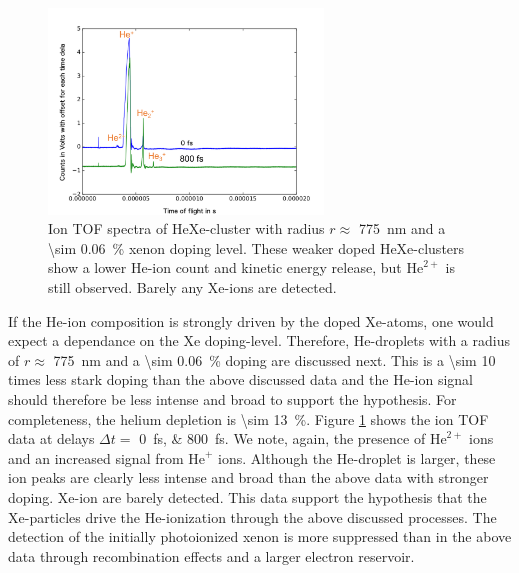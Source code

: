 %
\begin{figure}
 	\centering
 		\includegraphics[width=0.65\textwidth]{images/results/TOF-helium-xenon-cluster-13.png}
 	\caption[TOF spectra of HeXe-clusters with \SI{\sim 0.06}{\percent} Xe-doping at various delays.]{Ion TOF spectra of HeXe-cluster with radius $r\approx$ \SI{775}{\nano\meter} and a \SI{\sim 0.06}{\percent} xenon doping level. These weaker doped HeXe-clusters show a lower He-ion count and kinetic energy release, but $\text{He}^{2+}$ is still observed. Barely any Xe-ions are detected.}
 	\label{fig:TOF-helium-xenon-cluster-13}
\end{figure}
%
If the He-ion composition is strongly driven by the doped Xe-atoms, one would expect a dependance on the Xe doping-level. Therefore, He-droplets with a radius of $r\approx$ \SI{775}{\nano\meter} and a \SI{\sim 0.06}{\percent} doping are discussed next. This is a \num{\sim 10} times less stark doping than the above discussed data and the He-ion signal should therefore be less intense and broad to support the hypothesis. For completeness, the helium depletion is \SI{\sim 13}{\percent}. Figure \ref{fig:TOF-helium-xenon-cluster-13} shows the ion TOF data at delays $\Delta t=$ \SIlist{0;800}{\femto\second}. We note, again, the presence of $\text{He}^{2+}$ ions and an increased signal from $\text{He}^{+}$ ions. Although the He-droplet is larger, these ion peaks are clearly less intense and broad than the above data with stronger doping. Xe-ion are barely detected. This data support the hypothesis that the Xe-particles drive the He-ionization through the above discussed processes. The detection of the initially photoionized xenon is more suppressed than in the above data through recombination effects and a larger electron reservoir. 


